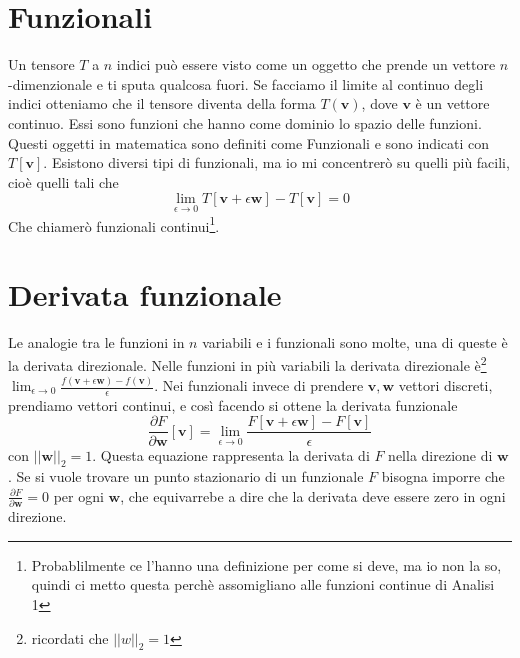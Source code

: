\documentclass[11pt,a4paper]{report}
\newcommand{\vettore}[1]{\mathbf{#1}}
\theoremstyle{definition}
\theoremstyle{plain}
\theoremstyle{plain}
\begin{document}
		\section{Funzionali}
			Un tensore $T$ a $n$ indici può essere visto come un oggetto che prende un vettore $n$-dimenzionale e ti sputa qualcosa fuori.
			Se facciamo il limite al continuo degli indici otteniamo che il tensore diventa della forma $T(\vettore v)$, dove $\vettore v$ è un vettore continuo.\newline
			Essi sono funzioni che hanno come dominio lo spazio delle funzioni. Questi oggetti in matematica sono definiti come Funzionali e sono indicati con $T[\vettore v]$.\newline
			Esistono diversi tipi di funzionali, ma io mi concentrerò su quelli più facili, cioè quelli tali che
			\begin{equation}
				\lim_{\epsilon 	\to 0}T[\vettore v+\epsilon \vettore w]-T[\vettore v]=0
			\end{equation}
			Che chiamerò funzionali continui\footnote{Probablilmente ce l'hanno una definizione per come si deve, ma io non la so, quindi ci metto questa perchè assomigliano alle funzioni continue di Analisi 1}.



		\section{Derivata funzionale}
			Le analogie tra le funzioni in $n$ variabili e i funzionali sono molte, una di queste è la derivata direzionale.\newline
			Nelle funzioni in più variabili la derivata direzionale è\footnote{ricordati che $||w||_2=1$} $\lim_{\epsilon \to 0}\frac{f(\vettore v+\epsilon\vettore w)-f(\vettore v)}{\epsilon}$. Nei funzionali invece di prendere $\vettore v,\vettore w$ vettori discreti, prendiamo vettori continui, e così facendo si ottene la derivata funzionale
			\begin{equation}
				\frac{\partial F}{\partial \vettore w}[\vettore v]=\lim_{\epsilon \to 0}\frac{F[\vettore v+\epsilon \vettore w]-F[\vettore v]}{\epsilon}
			\end{equation}
			con $||\vettore w||_2=1$. Questa equazione rappresenta la derivata di $F$ nella direzione di $\vettore w$.\newline
			Se si vuole trovare un punto stazionario di un funzionale $F$ bisogna imporre che $\frac{\partial F}{\partial \vettore w}=0$ per ogni $\vettore w$, che equivarrebe a dire che la derivata deve essere zero in ogni direzione.\newline
\end{document}
